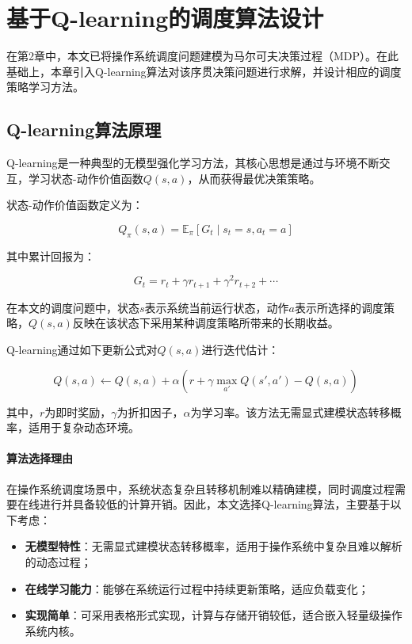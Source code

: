 \section{基于Q-learning的调度算法设计}

在第2章中，本文已将操作系统调度问题建模为马尔可夫决策过程（MDP）。在此基础上，本章引入Q-learning算法对该序贯决策问题进行求解，并设计相应的调度策略学习方法。

\subsection{Q-learning算法原理}

Q-learning是一种典型的无模型强化学习方法，其核心思想是通过与环境不断交互，学习状态-动作价值函数$Q(s,a)$，从而获得最优决策策略。

状态-动作价值函数定义为：

$$
Q_\pi(s,a) = \mathbb{E}_\pi \left[ G_t \mid s_t = s, a_t = a \right]
$$

其中累计回报为：

$$
G_t = r_t + \gamma r_{t+1} + \gamma^2 r_{t+2} + \cdots
$$

在本文的调度问题中，状态$s$表示系统当前运行状态，动作$a$表示所选择的调度策略，$Q(s,a)$反映在该状态下采用某种调度策略所带来的长期收益。

Q-learning通过如下更新公式对$Q(s,a)$进行迭代估计：

$$
Q(s,a) \leftarrow Q(s,a) + \alpha \left( r + \gamma \max_{a'} Q(s',a') - Q(s,a) \right)
$$

其中，$r$为即时奖励，$\gamma$为折扣因子，$\alpha$为学习率。该方法无需显式建模状态转移概率，适用于复杂动态环境。

\paragraph{算法选择理由}

在操作系统调度场景中，系统状态复杂且转移机制难以精确建模，同时调度过程需要在线进行并具备较低的计算开销。因此，本文选择Q-learning算法，主要基于以下考虑：

\begin{itemize}
\item \textbf{无模型特性}：无需显式建模状态转移概率，适用于操作系统中复杂且难以解析的动态过程；
\item \textbf{在线学习能力}：能够在系统运行过程中持续更新策略，适应负载变化；
\item \textbf{实现简单}：可采用表格形式实现，计算与存储开销较低，适合嵌入轻量级操作系统内核。
\end{itemize}

